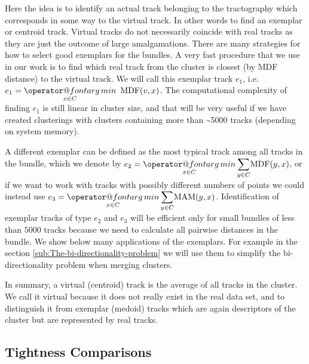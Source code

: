 \documentclass[preprint,authoryear,a4paper,10pt,onecolumn]{elsarticle}
\makeatletter
\def\argmin{\mathop{\operator@font arg\,min}}
\makeatother
\begin{document}
Here the idea is to identify an actual track belonging to the
tractography which corresponds in some way to the virtual track. In
other words to find an exemplar or centroid track. Virtual tracks do not
necessarily coincide with real tracks as they are just the outcome of
large amalgamations. There are many strategies for how to select good
exemplars for the bundles. A very fast procedure that we use in our
work is to find which real track from the cluster is closest (by MDF
distance) to the virtual track. We will call this exemplar track $e_{1}$,
i.e.~$e_{1}={\displaystyle \argmin_{x\in C}}\textrm{\,\ MDF}(v,x)$.
The computational complexity of finding $e_{1}$ is still linear in
cluster size, and that will be very useful if we have created
clusterings with clusters containing more than \textasciitilde5000 tracks
(depending on system memory).

A different exemplar can be defined as the most typical track among all
tracks in the bundle, which we denote by $e_{2}={\displaystyle
  \argmin_{x\in C}}\,{\displaystyle \sum_{y\in C}}\mathrm{MDF}(y,x)$, or
if we want to work with tracks with possibly different numbers of points
we could instead use $e_{3}={\displaystyle \argmin_{x\in
    C}}\,{\displaystyle \sum_{y\in C}}\mathrm{MAM}(y,x)$.
Identification of exemplar tracks of type $e_{2}$ and $e_{3}$ will be
efficient only for small bundles of less than $5000$ tracks because we
need to calculate all pairwise distances in the bundle. We show below
many applications of the exemplars. For example in the section
\ref{sub:The-bi-directionality-problem} we will use them to simplify the
bi-directionality problem when merging clusters.

In summary, a virtual (centroid) track is the average of all tracks in
the cluster. We call it virtual because it does not really exist in the
real data set, and to distinguish it from exemplar (medoid) tracks which
are again descriptors of the cluster but are represented by real tracks.

\subsection{Tightness Comparisons\label{sub:Tightness-comparisons-1}}
\end{document}
